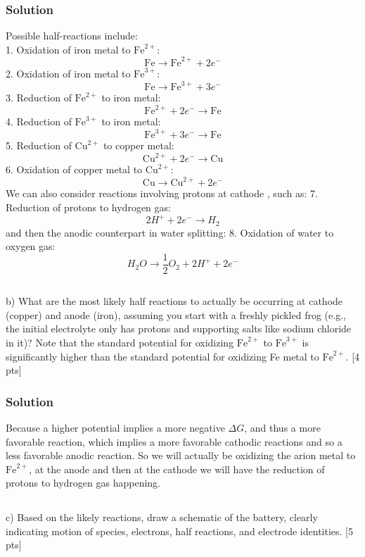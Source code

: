 \documentclass[12pt]{article}
\begin{document}
\subsubsection{Solution}
Possible half-reactions include:\\
1. Oxidation of iron metal to $\mathrm{Fe}^{2+}$:
\[\mathrm{Fe} \rightarrow \mathrm{Fe}^{2+} + 2e^-\]
2. Oxidation of iron metal to $\mathrm{Fe}^{3+}$:
\[\mathrm{Fe} \rightarrow \mathrm{Fe}^{3+} + 3  e^-\]
3. Reduction of $\mathrm{Fe}^{2+}$ to iron metal:
\[\mathrm{Fe}^{2+} + 2e^- \rightarrow \mathrm{Fe}\]
4. Reduction of $\mathrm{Fe}^{3+}$ to iron metal:
\[\mathrm{Fe}^{3+} + 3e^- \rightarrow \mathrm{Fe}\]
5. Reduction of $\mathrm{Cu}^{2+}$ to copper metal:
\[\mathrm{Cu}^{2+} + 2e^- \rightarrow \mathrm{Cu}\]
6. Oxidation of copper metal to $\mathrm{Cu}^{2+}$:
\[\mathrm{Cu} \rightarrow \mathrm{Cu}^{2+} + 2e^-\]
We can also consider reactions involving protons at cathode , such as:
7. Reduction of protons to hydrogen gas:
\[2H^+ + 2e^- \rightarrow H_2\]
and then the anodic counterpart in water splitting:
8. Oxidation of water to oxygen gas:
\[H_2O \rightarrow \frac{1}{2}O_2 + 2H^+ + 2e^-\]

\subsection{}
b) What are the most likely half reactions to actually be occurring at cathode (copper) and anode (iron), assuming you start with a freshly pickled frog (e.g., the initial electrolyte only has protons and supporting salts like sodium chloride in it)? Note that the standard potential for oxidizing $\mathrm{Fe}^{2+}$ to $\mathrm{Fe}^{3+}$ is significantly higher than the standard potential for oxidizing Fe metal to $\mathrm{Fe}^{2+}$. [4 pts]\\[0pt]
\subsubsection{Solution}
Because a higher potential implies a more negative $\Delta G$, and thus a more favorable reaction, which implies a more favorable cathodic reactions and so a less favorable anodic reaction. So we will actually be oxidizing the arion metal to $\mathrm{Fe}^{2+}$, at the anode and then at the cathode we will have the reduction of protons to hydrogen gas happening.
\subsection{}
c) Based on the likely reactions, draw a schematic of the battery, clearly indicating motion of species, electrons, half reactions, and electrode identities. [5 pts]\\
\end{document}
